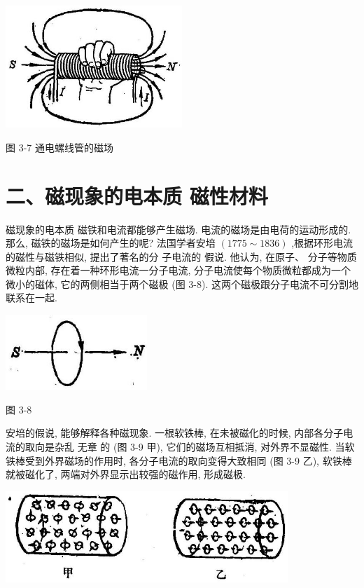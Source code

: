 \documentclass[10pt]{article}
\begin{document}
\begin{center}
\includegraphics[max width=0.5\textwidth]{images/01913056-1f15-74d8-9184-9aab52c9d66b_106_727792.jpg}
\end{center}

图 3-7 通电螺线管的磁场

\section*{二、磁现象的电本质 磁性材料}

磁现象的电本质 磁铁和电流都能够产生磁场. 电流的磁场是由电荷的运动形成的. 那么, 磁铁的磁场是如何产生的呢? 法国学者安培 \(\left( {{1775} \sim {1836}}\right)\) ,根据环形电流的磁性与磁铁相似, 提出了著名的分 子电流的 假说. 他认为, 在原子、 分子等物质微粒内部, 存在着一种环形电流一分子电流, 分子电流使每个物质微粒都成为一个微小的磁体, 它的两侧相当于两个磁极 (图 3-8). 这两个磁极跟分子电流不可分割地联系在一起.

\begin{center}
\includegraphics[max width=0.4\textwidth]{images/01913056-1f15-74d8-9184-9aab52c9d66b_107_114842.jpg}
\end{center}

图 3-8

安培的假说, 能够解释各种磁现象. 一根软铁棒, 在未被磁化的时候, 内部各分子电流的取向是杂乱 无章 的 (图 3-9 甲), 它们的磁场互相抵消, 对外界不显磁性. 当软铁棒受到外界磁场的作用时, 各分子电流的取向变得大致相同 (图 3-9 乙), 软铁棒就被磁化了, 两端对外界显示出较强的磁作用, 形成磁极.

\begin{center}
\includegraphics[max width=0.8\textwidth]{images/01913056-1f15-74d8-9184-9aab52c9d66b_107_460506.jpg}
\end{center}
\end{document}
